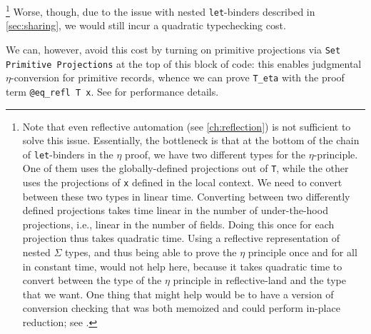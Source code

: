   \footnote{%
      Note that even reflective automation (see \autoref{ch:reflection}) is not sufficient to solve this issue.
      Essentially, the bottleneck is that at the bottom of the chain of \texttt{let}-binders in the $\eta$ proof, we have two different types for the $\eta$-principle.
      One of them uses the globally-defined projections out of \texttt{T}, while the other uses the projections of \texttt{x} defined in the local context.
      We need to convert between these two types in linear time.
      Converting between two differently defined projections takes time linear in the number of under-the-hood projections, i.e., linear in the number of fields.
      Doing this once for each projection thus takes quadratic time.
      Using a reflective representation of nested $\Sigma$ types, and thus being able to prove the $\eta$ principle once and for all in constant time, would not help here, because it takes quadratic time to convert between the type of the $\eta$ principle in reflective-land and the type that we want.
      One thing that might help would be to have a version of conversion checking that was both memoized and could perform in-place reduction; see .%
  }
  Worse, though, due to the issue with nested \texttt{let}-binders described in \autoref{sec:sharing}, we would still incur a quadratic typechecking cost.

  We can, however, avoid this cost by turning on primitive projections via \texttt{Set Primitive Projections} at the top of this block of code:
  this enables judgmental $\eta$-conversion for primitive records, whence we can prove \texttt{T_eta} with the proof term \texttt{@eq_refl T x}.
  See  for performance details.



